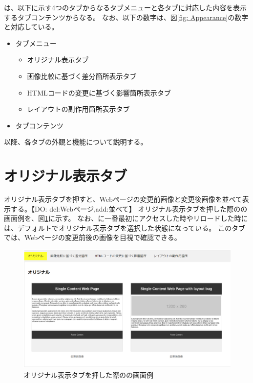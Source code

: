 \toolName は、以下に示す4つのタブからなるタブメニューと各タブに対応した内容を表示するタブコンテンツからなる。
なお、以下の数字は、図\ref{fig: Appearance}の数字と対応している。
\begin{itemize}
    \item[①] タブメニュー
          \begin{itemize}
              \item オリジナル表示タブ
              \item 画像比較に基づく差分箇所表示タブ
              \item HTMLコードの変更に基づく影響箇所表示タブ
              \item レイアウトの副作用箇所表示タブ
          \end{itemize}
    \item[②] タブコンテンツ
\end{itemize}
\par
以降、各タブの外観と機能について説明する。



\section{オリジナル表示タブ}\label{sec:original_tab}
オリジナル表示タブを押すと、Webページの変更前画像と変更後画像を並べて表示する。【DO: del:Webページ,add:並べて】
オリジナル表示タブを押した際の\toolName の画面例を、図\ref{fig: Appearance_original_tab}に示す。
なお、\toolName に一番最初にアクセスした時やリロードした時には、デフォルトでオリジナル表示タブを選択した状態になっている。
このタブでは、Webページの変更前後の画像を目視で確認できる。
\begin{figure}[tp]
    \begin{center}
        \includegraphics[width=1.0\columnwidth]{image/3_original_tab.png}
        \caption{オリジナル表示タブを押した際の\toolName の画面例}
        \label{fig: Appearance_original_tab}
    \end{center}
\end{figure}



